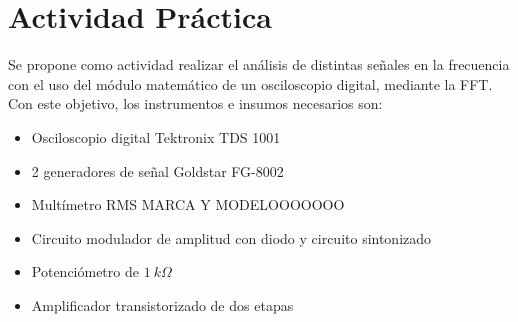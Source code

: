   \pagebreak
  \section{Actividad Práctica}
    Se propone como actividad realizar el análisis de distintas señales en la frecuencia con el uso del
    módulo matemático de un osciloscopio digital, mediante la FFT. Con este objetivo, los instrumentos
    e insumos necesarios son:

    \begin{itemize}
      \item Osciloscopio digital Tektronix TDS 1001
      \item 2 generadores de señal Goldstar FG-8002
      \item Multímetro RMS MARCA Y MODELOOOOOOO
      \item Circuito modulador de amplitud con diodo y circuito sintonizado
      \item Potenciómetro de $1~k\Omega$
      \item Amplificador transistorizado de dos etapas
    \end{itemize}

    
    
    
    
    
    
    
